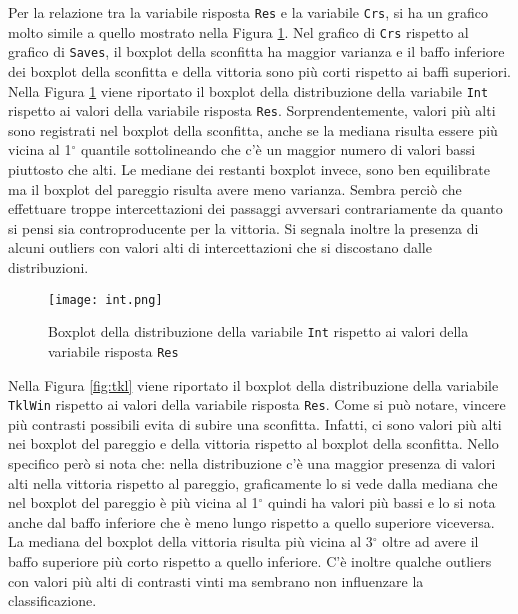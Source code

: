 Per la relazione tra la variabile risposta \texttt{Res} e la variabile \texttt{Crs}, si ha un grafico molto simile a quello mostrato nella Figura \ref{fig:int}. Nel grafico di \texttt{Crs} rispetto al grafico di \texttt{Saves}, il boxplot della sconfitta ha maggior varianza e il baffo inferiore dei boxplot della sconfitta e della vittoria sono più corti rispetto ai baffi superiori.\\
Nella Figura \ref{fig:int} viene riportato il boxplot della distribuzione della variabile \texttt{Int} rispetto ai valori della variabile risposta \texttt{Res}. Sorprendentemente, valori più alti sono registrati nel boxplot della sconfitta, anche se la mediana risulta essere più vicina al 1$^{\circ}$ quantile sottolineando che c'è un maggior numero di valori bassi piuttosto che alti. Le mediane dei restanti boxplot invece, sono ben equilibrate ma il boxplot del pareggio risulta avere meno varianza. Sembra perciò che effettuare troppe intercettazioni dei passaggi avversari contrariamente da quanto si pensi sia controproducente per la vittoria. Si segnala inoltre la presenza di alcuni outliers con valori alti di intercettazioni che si discostano dalle distribuzioni.\\
\begin{figure}[htbp]
	\begin{center}
		\texttt{[image: int.png]}
		\caption{Boxplot della distribuzione della variabile \texttt{Int} rispetto ai valori della variabile risposta \texttt{Res}} \label{fig:int}
	\end{center}
\end{figure}
Nella Figura \ref{fig:tkl} viene riportato il boxplot della distribuzione della variabile \texttt{TklWin} rispetto ai valori della variabile risposta \texttt{Res}. Come si può notare, vincere più contrasti possibili evita di subire una sconfitta. Infatti, ci sono valori più alti nei boxplot del pareggio e della vittoria rispetto al boxplot della sconfitta. Nello specifico però si nota che: nella distribuzione c'è una maggior presenza di valori alti nella vittoria rispetto al pareggio, graficamente lo si vede dalla mediana che nel boxplot del pareggio è più vicina al 1$^{\circ}$ quindi ha valori più bassi e lo si nota anche dal baffo inferiore che è meno lungo rispetto a quello superiore viceversa. La mediana del boxplot della vittoria risulta più vicina al 3$^{\circ}$ oltre ad avere il baffo superiore più corto rispetto a quello inferiore. C'è inoltre qualche outliers con valori più alti di contrasti vinti ma sembrano non influenzare la classificazione.\\
